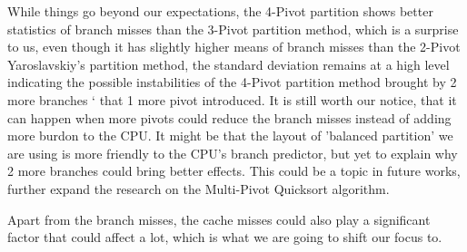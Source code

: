 \documentclass{article}
\begin{document}
While things go beyond our expectations, the 4-Pivot partition shows better statistics of branch misses than the 3-Pivot partition method, which is a surprise to us,
even though it has slightly higher means of branch misses than the 2-Pivot Yaroslavskiy's partition method, the standard deviation remains at a high level indicating
the possible instabilities of the 4-Pivot partition method brought by 2 more branches \hypertarget{2MoreBranches}{`} that 1 more pivot introduced. It is still worth our notice, that it can happen when more pivots could reduce the branch misses instead of adding more burdon to the CPU.
It might be that the layout of 'balanced partition' we are using is more friendly to the CPU's branch predictor, but yet to explain why 2 more branches could bring better effects. This could be a topic in future works, further expand the research on the Multi-Pivot Quicksort algorithm. 

Apart from the branch misses, the cache misses could also play a significant factor that could affect a lot, which is what we are going to shift our focus to.
\end{document}
